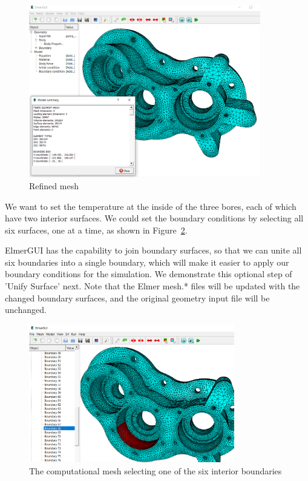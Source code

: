\begin{figure}[H]
\begin{center}
\includegraphics[width=0.90\textwidth]{refinedmesh}
\caption{Refined mesh}\label{fg:refinedmesh}
\end{center}
\end{figure}

We want to set the temperature at the inside of the three bores, each of which have two interior surfaces.  We could set the boundary conditions by selecting all six surfaces, one at a time, as shown in Figure~\ref{fg:select}.

ElmerGUI has the capability to join boundary surfaces, so that we can unite all six boundaries into a single boundary, which will make it easier to apply our boundary conditions for the simulation.  We demonstrate this optional step of 'Unify Surface' next.  Note that the Elmer mesh.* files will be updated with the changed boundary surfaces, and the original geometry input file will be unchanged.\\ 

\begin{figure}[H]
\begin{center}
\includegraphics[width=0.8\textwidth]{select}
\caption{The computational mesh selecting one of the six interior boundaries}\label{fg:select}
\end{center}
\end{figure}

